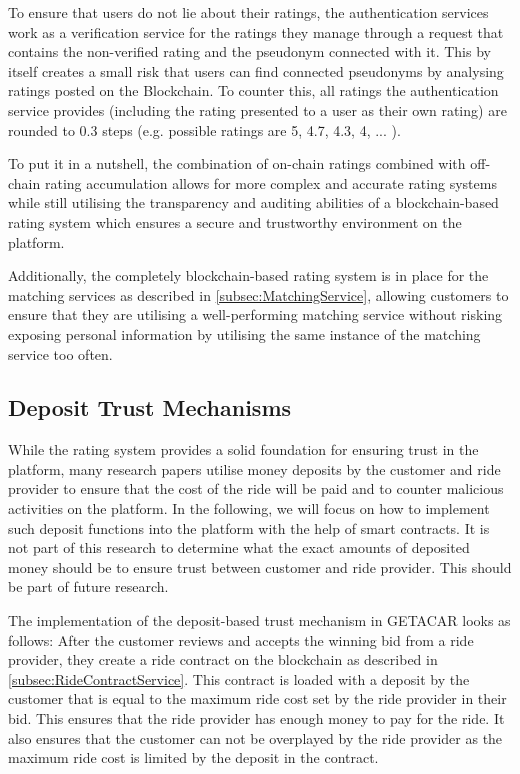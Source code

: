 To ensure that users do not lie about their ratings, the authentication services work as a verification service for the ratings they manage through a request that contains the non-verified rating and the pseudonym connected with it. This by itself creates a small risk that users can find connected pseudonyms by analysing ratings posted on the Blockchain. To counter this, all ratings the authentication service provides (including the rating presented to a user as their own rating) are rounded to 0.3 steps (e.g. possible ratings are 5, 4.7, 4.3, 4, ... ). 


To put it in a nutshell, the combination of on-chain ratings combined with off-chain rating accumulation allows for more complex and accurate rating systems while still utilising the transparency and auditing abilities of a blockchain-based rating system which ensures a secure and trustworthy environment on the platform.

Additionally, the completely blockchain-based rating system is in place for the matching services as described in \ref{subsec:MatchingService}, allowing customers to ensure that they are utilising a well-performing matching service without risking exposing personal information by utilising the same instance of the matching service too often.

\subsection{Deposit Trust Mechanisms}\label{subsec:DepositTrust}
While the rating system provides a solid foundation for ensuring trust in the platform, many research papers utilise money deposits by the customer and ride provider to ensure that the cost of the ride will be paid and to counter malicious activities on the platform. In the following, we will focus on how to implement such deposit functions into the platform with the help of smart contracts. It is not part of this research to determine what the exact amounts of deposited money should be to ensure trust between customer and ride provider. This should be part of future research.

The implementation of the deposit-based trust mechanism in GETACAR looks as follows:
After the customer reviews and accepts the winning bid from a ride provider, they create a ride contract on the blockchain as described in \ref{subsec:RideContractService}. This contract is loaded with a deposit by the customer that is equal to the maximum ride cost set by the ride provider in their bid. This ensures that the ride provider has enough money to pay for the ride. It also ensures that the customer can not be overplayed by the ride provider as the maximum ride cost is limited by the deposit in the contract. 

